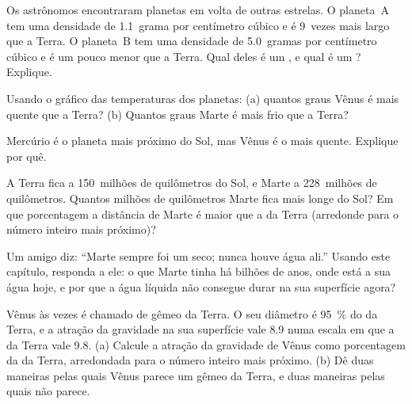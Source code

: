 \begin{exercise}[$\star\star$]\label{exo:g6:earth-a-planet:7}
Os astrônomos encontraram planetas em volta de outras estrelas. O
planeta~A tem uma densidade de 1.1~grama por centímetro cúbico e é 9~vezes
mais largo que a Terra. O planeta~B tem uma densidade de 5.0~gramas por
centímetro cúbico e é um pouco menor que a Terra. Qual deles é um , e qual é um ? Explique.
\end{exercise}

\begin{exercise}[$\star\star$]\label{exo:g6:earth-a-planet:8}
Usando o gráfico das temperaturas dos planetas: (a) quantos graus Vênus é
mais quente que a Terra? (b) Quantos graus Marte é mais frio que a Terra?
\end{exercise}

\begin{exercise}[$\star\star$]\label{exo:g6:earth-a-planet:9}
Mercúrio é o planeta mais próximo do Sol, mas Vênus é o mais quente.
Explique por quê.
\end{exercise}

\begin{exercise}[$\star\star$]\label{exo:g6:earth-a-planet:10}
A Terra fica a 150~milhões de quilômetros do Sol, e Marte a 228~milhões de
quilômetros. Quantos milhões de quilômetros Marte fica mais longe do Sol?
Em que porcentagem a distância de Marte é maior que a da Terra (arredonde
para o número inteiro mais próximo)?
\end{exercise}

\begin{exercise}[$\star\star\star$]\label{exo:g6:earth-a-planet:11}
Um amigo diz: ``Marte sempre foi um  seco; nunca houve água ali.''
Usando este capítulo, responda a ele: o que Marte tinha há bilhões de anos,
onde está a sua água hoje, e por que a água líquida não consegue durar na
sua superfície agora?
\end{exercise}

\begin{exercise}[$\star\star\star$]\label{exo:g6:earth-a-planet:12}
Vênus às vezes é chamado de gêmeo da Terra. O seu diâmetro é 95~\% do da
Terra, e a atração da gravidade na sua superfície vale 8.9 numa escala em
que a da Terra vale 9.8. (a) Calcule a atração da gravidade de Vênus como
porcentagem da da Terra,
arredondada para o número inteiro mais próximo. (b) Dê duas maneiras pelas
quais Vênus parece um gêmeo da Terra, e duas maneiras pelas quais não
parece.
\end{exercise}

